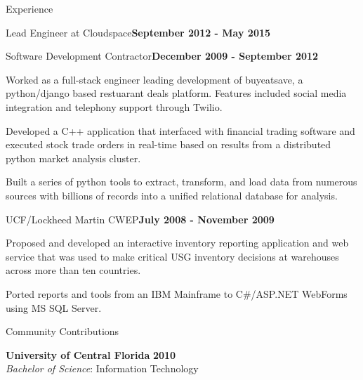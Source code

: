 \documentclass{resume} %
\begin{document}
\begin{rSection}{Experience}
\begin{rSubsection}{Lead Engineer at Cloudspace}{\bf September 2012 - May 2015}{}{}
\end{rSubsection}


\begin{rSubsection}{Software Development Contractor}{\bf December 2009 - September 2012}{}{}

\item Worked as a full-stack engineer leading development of buyeatsave, a python/django based restuarant deals platform.  Features included social media integration and telephony support through Twilio.
\item Developed a C++ application that interfaced with financial trading software and executed stock trade orders in real-time based on results from a distributed python market analysis cluster.
\item Built a series of python tools to extract, transform, and load data from numerous sources with billions of records into a unified relational database for analysis.


\end{rSubsection}


\begin{rSubsection}{UCF/Lockheed Martin CWEP}{\bf July 2008 - November 2009}{}{}

\item Proposed and developed an interactive inventory reporting application and web service that was used to make critical USG inventory decisions at warehouses across more than ten countries.
\item Ported reports and tools from an IBM Mainframe to C\#/ASP.NET WebForms using MS SQL Server.

\end{rSubsection}


\end{rSection}


\begin{rSection}{Community Contributions}

{\bf University of Central Florida} \hfill {\bf 2010} \\ 
{\it Bachelor of Science}: Information Technology \\
\end{rSection}
\end{document}
